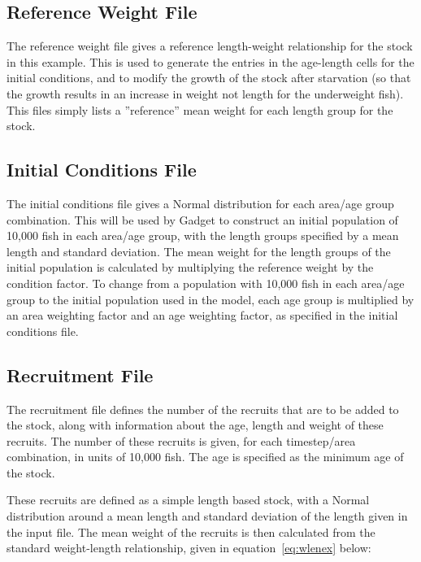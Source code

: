 \documentclass[10pt,twoside]{article}
\begin{document}
{\small }

\subsection{Reference Weight File}
The reference weight file gives a reference length-weight relationship for the stock in this example.  This is used to generate the entries in the age-length cells for the initial conditions, and to modify the growth of the stock after starvation (so that the growth results in an increase in weight not length for the underweight fish).  This files simply lists a ''reference'' mean weight for each length group for the stock.

{\small }

\subsection{Initial Conditions File}
The initial conditions file gives a Normal distribution for each area/age group combination.  This will be used by Gadget to construct an initial population of 10,000 fish in each area/age group, with the length groups specified by a mean length and standard deviation.  The mean weight for the length groups of the initial population is calculated by multiplying the reference weight by the condition factor.  To change from a population with 10,000 fish in each area/age group to the initial population used in the model, each age group is multiplied by an area weighting factor and an age weighting factor, as specified in the initial conditions file.

{\small }

\subsection{Recruitment File}
The recruitment file defines the number of the recruits that are to be added to the stock, along with information about the age, length and weight of these recruits.  The number of these recruits is given, for each timestep/area combination, in units of 10,000 fish.  The age is specified as the minimum age of the stock.

\bigskip
These recruits are defined as a simple length based stock, with a Normal distribution around a mean length and standard deviation of the length given in the input file.  The mean weight of the recruits is then calculated from the standard weight-length relationship, given in equation~\ref{eq:wlenex} below:
\end{document}
